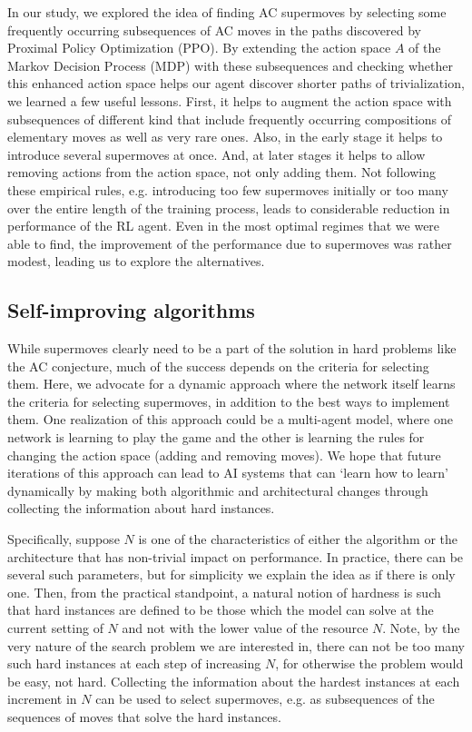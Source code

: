 In our study, we explored the idea of finding AC supermoves by selecting some frequently occurring subsequences of AC moves in the paths discovered by Proximal Policy Optimization (PPO). By extending the action space $A$ of the Markov Decision Process (MDP) with these subsequences and checking whether this enhanced action space helps our agent discover shorter paths of trivialization, we learned a few useful lessons. First, it helps to augment the action space with subsequences of different kind that include frequently occurring compositions of elementary moves as well as very rare ones. Also, in the early stage it helps to introduce several supermoves at once. And, at later stages it helps to allow removing actions from the action space, not only adding them. Not following these empirical rules, e.g. introducing too few supermoves initially or too many over the entire length of the training process, leads to considerable reduction in performance of the RL agent. Even in the most optimal regimes that we were able to find, the improvement of the performance due to supermoves was rather modest, leading us to explore the alternatives.

\subsection{Self-improving algorithms}

While supermoves clearly need to be a part of the solution in hard problems like the AC conjecture, much of the success depends on the criteria for selecting them. Here, we advocate for a dynamic approach where the network itself learns the criteria for selecting supermoves, in addition to the best ways to implement them. One realization of this approach could be a multi-agent model, where one network is learning to play the game and the other is learning the rules for changing the action space (adding and removing moves). We hope that future iterations of this approach can lead to AI systems that can `learn how to learn' dynamically by making both algorithmic and architectural changes through collecting the information about hard instances.

Specifically, suppose $N$ is one of the characteristics of either the algorithm or the architecture that has non-trivial impact on performance. In practice, there can be several such parameters, but for simplicity we explain the idea as if there is only one. Then, from the practical standpoint, a natural notion of hardness is such that hard instances are defined to be those which the model can solve at the current setting of $N$ and not with the lower value of the resource $N$. Note, by the very nature of the search problem we are interested in, there can not be too many such hard instances at each step of increasing $N$, for otherwise the problem would be easy, not hard. Collecting the information about the hardest instances at each increment in $N$ can be used to select supermoves, e.g. as subsequences of the sequences of moves that solve the hard instances.

